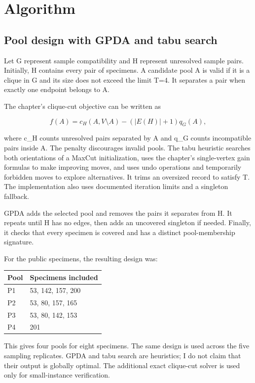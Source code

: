 \hypertarget{algorithm}{%
\section{Algorithm}\label{algorithm}}

\hypertarget{pool-design-with-gpda-and-tabu-search}{%
\subsection{Pool design with GPDA and tabu
search}\label{pool-design-with-gpda-and-tabu-search}}

Let G represent sample compatibility and H represent unresolved sample
pairs. Initially, H contains every pair of specimens. A candidate pool A
is valid if it is a clique in G and its size does not exceed the limit
T=4. It separates a pair when exactly one endpoint belongs to A.

The chapter's clique-cut objective can be written as

\[
f(A)=c_H(A,V\setminus A)-(|E(H)|+1)q_G(A),
\]

where c\_H counts unresolved pairs separated by A and q\_G counts
incompatible pairs inside A. The penalty discourages invalid pools. The
tabu heuristic searches both orientations of a MaxCut initialization,
uses the chapter's single-vertex gain formulas to make improving moves,
and uses undo operations and temporarily forbidden moves to explore
alternatives. It trims an oversized record to satisfy T. The
implementation also uses documented iteration limits and a singleton
fallback.

GPDA adds the selected pool and removes the pairs it separates from H.
It repeats until H has no edges, then adds an uncovered singleton if
needed. Finally, it checks that every specimen is covered and has a
distinct pool-membership signature.

For the public specimens, the resulting design was:

\begin{longtable}[]{@{}ll@{}}
\toprule\noalign{}
Pool & Specimens included \\
\midrule\noalign{}
\endhead
\bottomrule\noalign{}
\endlastfoot
P1 & 53, 142, 157, 200 \\
P2 & 53, 80, 157, 165 \\
P3 & 53, 80, 142, 153 \\
P4 & 201 \\
\end{longtable}

This gives four pools for eight specimens. The same design is used
across the five sampling replicates. GPDA and tabu search are
heuristics; I do not claim that their output is globally optimal. The
additional exact clique-cut solver is used only for small-instance
verification.

